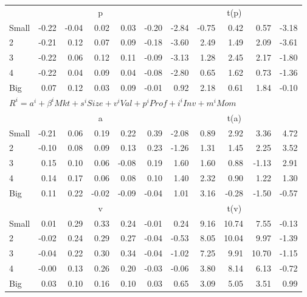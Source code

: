 \begin{table}[!ht]
\begin{tabular}{lrrrrrrrrrr}
  
     & \multicolumn{5}{c}{p} & \multicolumn{5}{c}{t(p)}   \\
     \cmidrule(r){2-6} \cmidrule(r){7-11} 
    Small  & -0.22  & -0.04  & 0.02  & 0.03  & -0.20  & -2.84  & -0.75  & 0.42  & 0.57  & -3.18   \\
    2  & -0.21  & 0.12  & 0.07  & 0.09  & -0.18  & -3.60  & 2.49  & 1.49  & 2.09  & -3.61   \\
    3  & -0.22  & 0.06  & 0.12  & 0.11  & -0.09  & -3.13  & 1.28  & 2.45  & 2.17  & -1.80   \\
    4  & -0.22  & 0.04  & 0.09  & 0.04  & -0.08  & -2.80  & 0.65  & 1.62  & 0.73  & -1.36   \\
    Big  & 0.07  & 0.12  & 0.03  & 0.09  & -0.01  & 0.92  & 2.18  & 0.61  & 1.84  & -0.10   \\


    \midrule
  \multicolumn{11}{l}{$R^i=a^i+\beta^iMkt+s^iSize+v^iVal+p^iProf+i^iInv+m^iMom$}  \\
  
     & \multicolumn{5}{c}{a} & \multicolumn{5}{c}{t(a)}   \\
     \cmidrule(r){2-6} \cmidrule(r){7-11} 
    Small  & -0.21  & 0.06  & 0.19  & 0.22  & 0.39  & -2.08  & 0.89  & 2.92  & 3.36  & 4.72   \\
    2  & -0.10  & 0.08  & 0.09  & 0.13  & 0.23  & -1.26  & 1.31  & 1.45  & 2.25  & 3.52   \\
    3  & 0.15  & 0.10  & 0.06  & -0.08  & 0.19  & 1.60  & 1.60  & 0.88  & -1.13  & 2.91   \\
    4  & 0.14  & 0.17  & 0.06  & 0.08  & 0.10  & 1.40  & 2.32  & 0.90  & 1.22  & 1.30   \\
    Big  & 0.11  & 0.22  & -0.02  & -0.09  & -0.04  & 1.01  & 3.16  & -0.28  & -1.50  & -0.57   \\


     & \multicolumn{5}{c}{v} & \multicolumn{5}{c}{t(v)}   \\
     \cmidrule(r){2-6} \cmidrule(r){7-11} 
    Small  & 0.01  & 0.29  & 0.33  & 0.24  & -0.01  & 0.24  & 9.16  & 10.74  & 7.55  & -0.13   \\
    2  & -0.02  & 0.24  & 0.29  & 0.27  & -0.04  & -0.53  & 8.05  & 10.04  & 9.97  & -1.39   \\
    3  & -0.04  & 0.22  & 0.30  & 0.34  & -0.04  & -1.02  & 7.25  & 9.91  & 10.70  & -1.15   \\
    4  & -0.00  & 0.13  & 0.26  & 0.20  & -0.03  & -0.06  & 3.80  & 8.14  & 6.13  & -0.72   \\
    Big  & 0.03  & 0.10  & 0.16  & 0.10  & 0.03  & 0.65  & 3.09  & 5.05  & 3.51  & 0.99   \\
    

\end{tabular}
\end{table}
